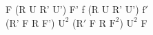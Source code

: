 F (R U R' U') F' f (R U R' U') $\text{f}'$\\
(R' F R F') $\text{U}^2$ ($\text{R}'$ F R $\text{F}^2$) $\text{U}^2$ F\\
